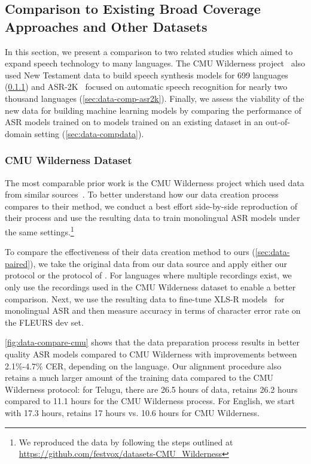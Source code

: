 \subsection{Comparison to Existing Broad Coverage Approaches and Other Datasets}

In this section, we present a comparison to two related studies which aimed to expand speech technology to many languages.
The CMU Wilderness project~\citep{black2019cmu} also used New Testament data to build speech synthesis models for 699 languages (\textsection\ref{sec:data-comp-cmu}) and ASR-2K~\citep{li2022asr2k} focused on automatic speech recognition for nearly two thousand languages (\textsection\ref{sec:data-comp-asr2k}).
Finally, we assess the viability of the new data for building machine learning models by comparing the performance of ASR models trained on \MMS{} to models trained on an existing dataset in an out-of-domain setting (\textsection\ref{sec:data-compdata}).


\subsubsection{CMU Wilderness Dataset}
\label{sec:data-comp-cmu}

The most comparable prior work is the CMU Wilderness project which used data from similar sources~\citep{black2019cmu}. 
To better understand how our data creation process compares to their method, we conduct a best effort side-by-side reproduction of their process and use the resulting data to train monolingual ASR models under the same settings.\footnote{We reproduced the data by following the steps outlined at \url{https://github.com/festvox/datasets-CMU_Wilderness}}

To compare the effectiveness of their data creation method to ours (\textsection\ref{sec:data-paired}), we take the original data from our data source and apply either our protocol or the protocol of \citet{black2019cmu}.
For languages where multiple recordings exist, we only use the recordings used in the CMU Wilderness dataset to enable a better comparison.
Next, we use the resulting data to fine-tune XLS-R models~\citep{babu22_interspeech} for monolingual ASR and then measure accuracy in terms of character error rate on the FLEURS dev set.

\autoref{fig:data-compare-cmu} shows that the \MMS{} data preparation process results in better quality ASR models compared to CMU Wilderness with improvements between 2.1\%-4.7\% CER, depending on the language.
Our alignment procedure also retains a much larger amount of the training data compared to the CMU Wilderness protocol:
for Telugu, there are 26.5 hours of data, \MMS{} retains 26.2 hours compared to 11.1 hours for the CMU Wilderness process.
For English, we start with 17.3 hours, \MMS{} retains 17 hours vs. 10.6 hours for CMU Wilderness. 

